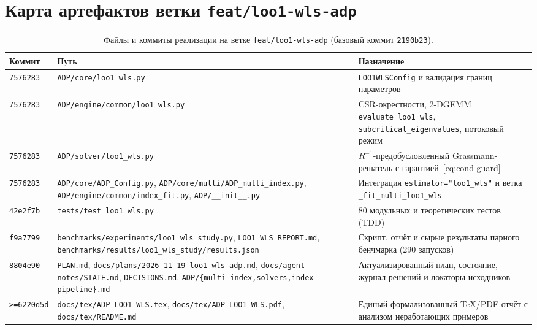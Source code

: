 \documentclass[11pt,a4paper]{article}
\numberwithin{equation}{section}
\theoremstyle{definition}
\theoremstyle{remark}
\newcommand{\code}[1]{\nolinkurl{#1}}
\begin{document}
\section{Карта артефактов ветки \texttt{feat/loo1-wls-adp}}
\label{app:artifacts}

\begin{table}[htbp]
\centering
\caption{Файлы и коммиты реализации на ветке \texttt{feat/loo1-wls-adp} (базовый коммит \texttt{2190b23}).}
\label{tab:artifacts}
\footnotesize
\begin{tabularx}{\textwidth}{@{}lL{6.5cm}Y@{}}
\toprule
Коммит & Путь & Назначение \\
\midrule
\code{7576283} & \code{ADP/core/loo1_wls.py} & \code{LOO1WLSConfig} и валидация границ параметров \\
\code{7576283} & \code{ADP/engine/common/loo1_wls.py} & CSR-окрестности, 2-DGEMM \code{evaluate_loo1_wls}, \code{subcritical_eigenvalues}, потоковый режим \\
\code{7576283} & \code{ADP/solver/loo1_wls.py} & $R^{-1}$-предобусловленный Grassmann-решатель с гарантией~\eqref{eq:cond-guard} \\
\code{7576283} & \code{ADP/core/ADP_Config.py}, \code{ADP/core/multi/ADP_multi_index.py}, \code{ADP/engine/common/index_fit.py}, \code{ADP/__init__.py} & Интеграция \code{estimator="loo1_wls"} и ветка \code{_fit_multi_loo1_wls} \\
\code{42e2f7b} & \code{tests/test_loo1_wls.py} & 80 модульных и теоретических тестов (TDD) \\
\code{f9a7799} & \code{benchmarks/experiments/loo1_wls_study.py}, \code{LOO1_WLS_REPORT.md}, \code{benchmarks/results/loo1_wls_study/results.json} & Скрипт, отчёт и сырые результаты парного бенчмарка (290 запусков) \\
\code{8804e90} & \code{PLAN.md}, \code{docs/plans/2026-11-19-loo1-wls-adp.md}, \code{docs/agent-notes/STATE.md}, \code{DECISIONS.md}, \code{ADP/\{multi-index,solvers,index-pipeline\}.md} & Актуализированный план, состояние, журнал решений и локаторы исходников \\
\code{>=6220d5d} & \code{docs/tex/ADP_LOO1_WLS.tex}, \code{docs/tex/ADP_LOO1_WLS.pdf}, \code{docs/tex/README.md} & Единый формализованный TeX/PDF-отчёт с анализом неработающих примеров \\
\bottomrule
\end{tabularx}
\end{table}
\end{document}
